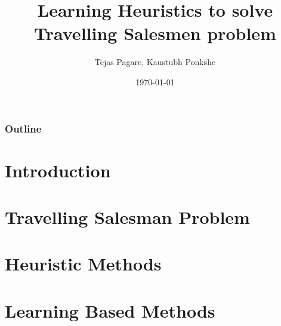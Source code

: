 \documentclass[9pt]{beamer}
\title[CS769 Optimization in ML]{Learning Heuristics to solve Travelling Salesmen problem} %
\author{Tejas Pagare, Kaustubh Ponkshe} %
\institute[IIT Bombay] %
{ CS769 Paper Presentation\\
\medskip

{Electrical Engineering Department}\\
{Indian Institute of Technology Bombay}\\
\vspace{10pt}\\

}
\date{\today} %
\begin{document}
\begin{frame}
\titlepage %
\end{frame}

\begin{frame}
\frametitle{Outline} %
\tableofcontents %
\end{frame}



\section{Introduction}

\section{Travelling Salesman Problem}

\section{Heuristic Methods}

\section{Learning Based Methods}
\end{document}
